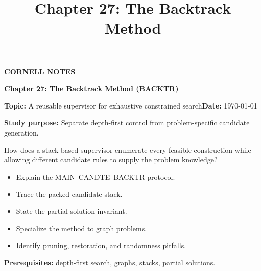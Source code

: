 \documentclass[10pt,letterpaper]{article}
\title{Chapter 27: The Backtrack Method}
\author{}
\date{}
\begin{document}
\maketitle
\begin{tcolorbox}[colback=Paper,colframe=Ink]{\small\bfseries\color{Teal}CORNELL NOTES}\par{\LARGE\bfseries Chapter 27: The Backtrack Method (BACKTR)}\par\medskip\textbf{Topic:} A reusable supervisor for exhaustive constrained search\hfill\textbf{Date:} \today\par\textbf{Study purpose:} Separate depth-first control from problem-specific candidate generation.\end{tcolorbox}
\begin{tcolorbox}[colback=Teal!5,colframe=Teal,title=Essential question]How does a stack-based supervisor enumerate every feasible construction while allowing different candidate rules to supply the problem knowledge?\end{tcolorbox}
\begin{tcolorbox}[colback=white,colframe=Mist,title=Learning objectives]\begin{itemize}\item Explain the MAIN--CANDTE--BACKTR protocol.\item Trace the packed candidate stack.\item State the partial-solution invariant.\item Specialize the method to graph problems.\item Identify pruning, restoration, and randomness pitfalls.\end{itemize}\textbf{Prerequisites:} depth-first search, graphs, stacks, partial solutions.\end{tcolorbox}
\end{document}
